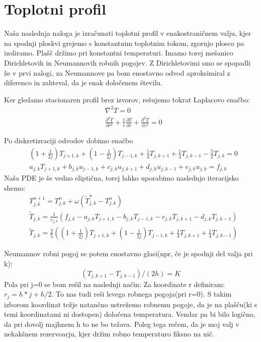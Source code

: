\documentclass{article}
\begin{document}
\section{Toplotni profil}

Naša naslednja naloga je izračunati toplotni profil v enakostraničnem valju, kjer na spodnji ploskvi grejemo s konstantnim toplotnim tokom, zgornjo plosco pa izoliramo. Plašč držimo pri konstantni temperaturi. Imamo torej mešanico Dirichletovih in Neumannovih robnih pogojev. Z Dirichletovimi smo se spopadli že v prvi nalogi, za Neumannove pa bom enostavno odvod aproksimiral z diferenco in zahteval, da je enak določenem številu.

Ker gledamo stacionaren profil brez izvorov, rešujemo tokrat Laplacovo enačbo:
\begin{align*}
&\nabla^2 T = 0 \\
&\frac{\partial^2 T}{\partial r^2} + \frac{1}{r} \frac{\partial T}{\partial r} + \frac{\partial^2 T}{\partial z^2} = 0 
\end{align*}

Po diskretizraciji odvodov dobimo enačbo
\begin{align*}
&\left(1+\frac{1}{2j}\right) T_{j+1,k} + \left(1-\frac{1}{2j}\right) T_{j-1,k} + \frac{1}{4} T_{j,k+1} + \frac{1}{4} T_{j,k-1} - \frac{5}{2} T_{j,k} = 0 \\
&a_{j,k} T_{j+1,k} + b_{j,k} u_{j-1,k} + c_{j,k} u_{j,k+1} + d_{j,k} u_{j,k-1} + e_{j,k} u_{j,k} = f_{j,k} 
\end{align*}
Naša PDE je še vedno eliptična, torej lahko uporabimo naslednjo iteracijsko shemo:
\begin{align*}
&T_{j,k}^{n+1} = T_{j,k}^{n} + \omega (\tilde{T}_{j,k}^{n}-T_{j,k}^{n}) \\
&\tilde{T}_{j,k} = \frac{1}{e_{j,k}} ( f_{j,k} - a_{j,k} T_{j+1,k} - b_{j,k} T_{j-1,k} - c_{j,k} T_{j,k+1} - d_{j,k} T_{j,k-1}) \\
&\tilde{T}_{j,k} = \frac{2}{5} \left( \left(1+\frac{1}{2j}\right) T_{j+1,k} + \left(1-\frac{1}{2j}\right)T_{j-1,k} + \frac{1}{4} T_{j,k+1} + \frac{1}{4} T_{j,k-1} \right)
\end{align*}

Neumannov robni pogoj se potem enostavno glasi(npr, če je spodnji del valja pri k):
\begin{equation*}
(T_{j,k+1}-T_{j,k-1})/(2h) = K 
\end{equation*}
Pola pri j=0 se bom rešil na naslednji način: Za koordinate r definiram: $r_j = h*j + h/2$. To nas tudi reši levega robnega pogoja(pri r=0).
S takim izborom koordinat težje natančno ustrežemo robnemu pogoje, da je na plašču(ki s temi koordinatami ni dostopen) določena temperatura. Vendar pa bi bilo logično, da pri dovolj majhnem h to ne bo težava. Poleg tega rečem, da je moj valj v nekakšnem rezervoarju, kjer držim robno temperaturo fiksno na nič.
\end{document}
